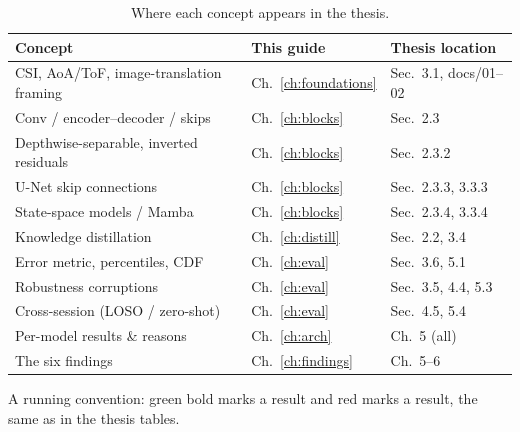 \begin{table}[H]
\centering
\caption{Where each concept appears in the thesis.}
\label{tab:concept_map}
\small
\begin{tabular}{@{}lll@{}}
\toprule
\textbf{Concept} & \textbf{This guide} & \textbf{Thesis location} \\
\midrule
CSI, AoA/ToF, image-translation framing & Ch.~\ref{ch:foundations} & Sec.~3.1, docs/01--02 \\
Conv / encoder--decoder / skips         & Ch.~\ref{ch:blocks}      & Sec.~2.3 \\
Depthwise-separable, inverted residuals & Ch.~\ref{ch:blocks}      & Sec.~2.3.2 \\
U-Net skip connections                  & Ch.~\ref{ch:blocks}      & Sec.~2.3.3, 3.3.3 \\
State-space models / Mamba              & Ch.~\ref{ch:blocks}      & Sec.~2.3.4, 3.3.4 \\
Knowledge distillation                  & Ch.~\ref{ch:distill}     & Sec.~2.2, 3.4 \\
Error metric, percentiles, CDF          & Ch.~\ref{ch:eval}        & Sec.~3.6, 5.1 \\
Robustness corruptions                  & Ch.~\ref{ch:eval}        & Sec.~3.5, 4.4, 5.3 \\
Cross-session (LOSO / zero-shot)        & Ch.~\ref{ch:eval}        & Sec.~4.5, 5.4 \\
Per-model results \& reasons            & Ch.~\ref{ch:arch}        & Ch.~5 (all) \\
The six findings                        & Ch.~\ref{ch:findings}    & Ch.~5--6 \\
\bottomrule
\end{tabular}
\end{table}

A running convention: green bold marks a  result and red marks a  result, the
same as in the thesis tables.
